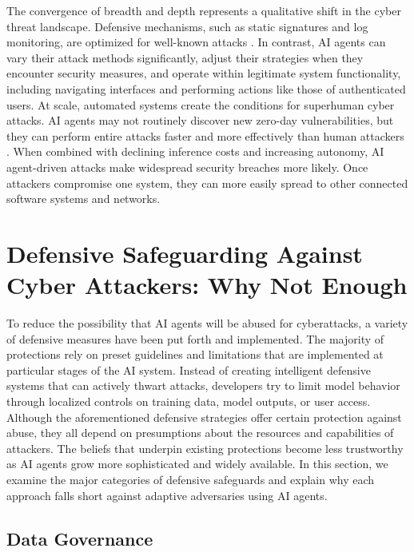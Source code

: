 \documentclass{article}
\theoremstyle{plain}
\theoremstyle{definition}
\theoremstyle{remark}
\begin{document}
The convergence of breadth and depth represents a qualitative shift in the cyber threat landscape. Defensive mechanisms, such as static signatures and log monitoring, are optimized for well-known attacks \citep{iyer2021signatures}. In contrast, AI agents can vary their attack methods significantly, adjust their strategies when they encounter security measures, and operate within legitimate system functionality, including navigating interfaces and performing actions like those of authenticated users.
At scale, automated systems create the conditions for superhuman cyber attacks. AI agents may not routinely discover new zero-day vulnerabilities, but they can perform entire attacks faster and more effectively than human attackers \citep{crowdstrike_ai_attacks}. When combined with declining inference costs and increasing autonomy, AI agent-driven attacks make widespread security breaches more likely. Once attackers compromise one system, they can more easily spread to other connected software systems and networks.




\section{Defensive Safeguarding Against Cyber Attackers: Why Not Enough}
\label{sec:3}

To reduce the possibility that AI agents will be abused for cyberattacks, a variety of defensive measures have been put forth and implemented. The majority of protections rely on preset guidelines and limitations that are implemented at particular stages of the AI system. Instead of creating intelligent defensive systems that can actively thwart attacks, developers try to limit model behavior through localized controls on training data, model outputs, or user access. Although the aforementioned defensive strategies offer certain protection against abuse, they all depend on presumptions about the resources and capabilities of attackers. The beliefs that underpin existing protections become less trustworthy as AI agents grow more sophisticated and widely available. In this section, we examine the major categories of defensive safeguards and explain why each approach falls short against adaptive adversaries using AI agents.



\subsection{Data Governance}
\end{document}
